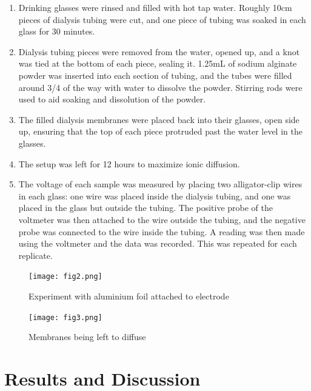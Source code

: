 \documentclass[letterpaper]{article}
\begin{document}
\begin{enumerate}
	\item Drinking glasses were rinsed and filled with hot tap water. Roughly 10cm pieces of dialysis tubing were cut, and one piece of tubing was soaked in each glass for 30 minutes.
	\item Dialysis tubing pieces were removed from the water, opened up, and a knot was tied at the bottom of each piece, sealing it. 1.25mL of sodium alginate powder was inserted into each section of tubing, and the tubes were filled around 3/4 of the way with water to dissolve the powder. Stirring rods were used to aid soaking and dissolution of the powder.
	\item The filled dialysis membranes were placed back into their glasses, open side up, ensuring that the top of each piece protruded past the water level in the glasses.
	\item The setup was left for 12 hours to maximize ionic diffusion.
	\item The voltage of each sample was measured by placing two alligator-clip wires in each glass: one wire was placed inside the dialysis tubing, and one was placed in the glass but outside the tubing. The positive probe of the voltmeter was then attached to the wire outside the tubing, and the negative probe was connected to the wire inside the tubing. A reading was then made using the voltmeter and the data was recorded. This was repeated for each replicate.
\end{enumerate}

\begin{figure}[h]
	\centering
	\texttt{[image: fig2.png]}
	\caption{Experiment with aluminium foil attached to electrode}
	\label{fig:2}
\end{figure}

\begin{figure}[h]
	\centering
	\texttt{[image: fig3.png]}
	\caption{Membranes being left to diffuse}
	\label{fig:3}
\end{figure}

\section{Results and Discussion}
\label{sec:results and Discussion}





\printbibliography[heading=bibintoc]
\end{document}
